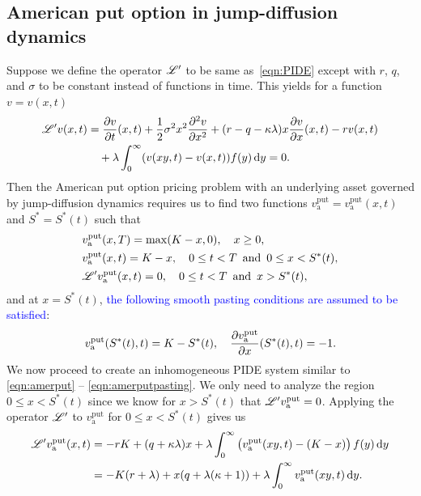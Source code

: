      \subsection{American put option in jump-diffusion dynamics}
     \label{sec:amerputJD}
     Suppose we define the operator $\mathscr L'$ to be same as~\eqref{eqn:PIDE} except with $r$, $q$, and $\sigma$ to be constant instead of functions in time. This yields for a function $v = v(x,t)$
   \begin{equation}
   	\label{eqn:PIDE2}
   	\begin{split}
   	\mathscr L'v(x,t) &= \frac{\partial v}{\partial t}(x,t) + \frac{1}{2}\sigma^2x^2\frac{\partial^2 v}{\partial x^2} + (r-q-\kappa\lambda)x\frac{\partial v}{\partial x}(x,t) - rv(x,t) \\
   	&{}\quad + \lambda\int_0^\infty (v(xy,t)-v(x,t))f(y) \, \mathrm d y = 0.
   	\end{split}
   \end{equation}
   Then the American put option pricing problem with an underlying asset governed by jump-diffusion dynamics requires us to find two functions $ v_{\text{a}}^{\text{put}} = v_{\text{a}}^{\text{put}}(x,t)$ and $S^* = S^*(t)$ such that
        \begin{equation}
        \label{eqn:amerputPIDE}
        \begin{split}
            &v_{\text{a}}^{\text{put}}(x,T) = \max(K-x,0), \quad x \geq 0, \\
            &v_{\text{a}}^{\text{put}}(x,t) = K-x, \quad 0 \leq t < T \enskip \text{and} \enskip 0 \leq x < S^*(t), \\
            &\mathscr{L'}v_{\text{a}}^{\text{put}}(x,t) = 0, \quad 0 \leq t < T \enskip \text{and} \enskip x > S^*(t),
        \end{split}
    \end{equation}
    and at $x = S^*(t)$, \textcolor{blue}{the following smooth pasting conditions are assumed to be satisfied}:
    	\begin{equation}
    		\label{eqn:amerputPIDEsmc}
    		v_{\text{a}}^{\text{put}}(S^*(t),t) = K - S^*(t), \quad \frac{\partial v_{\text{a}}^{\text{put}}}{\partial x}(S^*(t),t) = -1.
    	\end{equation}
    	We now proceed to create an inhomogeneous PIDE system similar to \eqref{eqn:amerput} -- \eqref{eqn:amerputpasting}. We only need to analyze the region $0 \leq x < S^*(t)$ since we know for $x > S^*(t)$ that $\mathscr L' v_{\text{a}}^{\text{put}} = 0$. Applying the operator $\mathscr L'$ to $v_{\text{a}}^{\text{put}}$ for $0 \leq x < S^*(t)$ gives us
        \begin{align*}
            \mathscr L'v_{\text{a}}^{\text{put}}(x,t) &= -rK + (q+\kappa\lambda)x + \lambda\int_0^\infty \left( v_{\text{a}}^{\text{put}}(xy,t) - (K-x)\right)f(y) \, \mathrm d y \\
            &= -K(r+\lambda) + x(q + \lambda(\kappa+1)) + \lambda\int_0^\infty v_{\text{a}}^{\text{put}}(xy,t) \, \mathrm d y.
        \end{align*}
